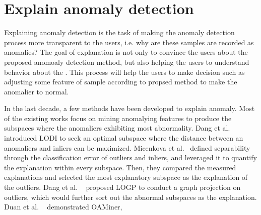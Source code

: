 \section{Explain anomaly detection}
\label{sec-explain_anomaly}
Explaining anomaly detection is the task of making
the anomaly detection process more transparent to the users,
i.e. why are these samples are recorded as anomalies?
The  goal of explanation is not only to
convince the users about the proposed anomoaly detection method,
but also helping the users to understand behavior about
the .
This process will help the users to make decision such as
adjusting some feature of sample according to propsed method to
make the anomalier to normal.

In the last decade,
a few methods have been developed to explain anomaly.
Most of the existing works focus on mining anomalying features to 
produce the subspaces where 
the anomaliers exhibiting most abnormality. 
Dang et al.~\cite{dang2013local} introduced LODI to 
seek an optimal subspace where 
the distance between an anomaliers and 
inliers can be maximized. 
Micenkova et al.~\cite{micenkova2013explaining}
defined separability through the classification error of outliers and 
inliers, 
and leveraged it to 
quantify the explanation within every subspace. 
Then, 
they compared the measured explanations and 
selected the most explanatory subspace as the explanation of the outliers. 
Dang et al. ~\cite{dang2014discriminative} 
proposed LOGP to 
conduct a graph projection on outliers, 
which would further sort out the abnormal subspaces as the explanation. 
Duan et al. ~\cite{duan2015mining} 
demonstrated OAMiner, 
